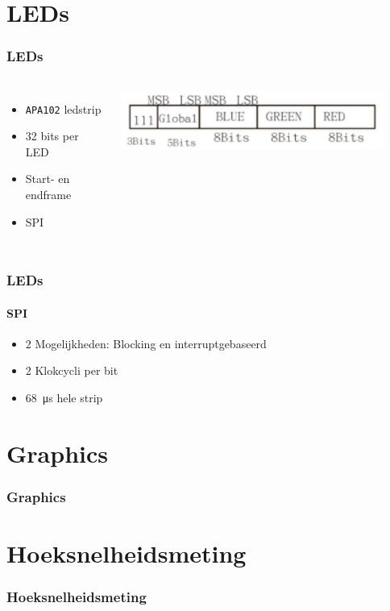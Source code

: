\documentclass{beamer}
\begin{document}
\section{LEDs}
\begin{frame}
  \frametitle{LEDs}

  \begin{columns}
    \begin{itemize}
    \item \texttt{APA102} ledstrip
    \item 32 bits per LED
    \item Start- en endframe
    \item SPI
    \end{itemize}

    \includegraphics[width=0.9\textwidth]{img/ledpakket.png}
  \end{columns}
\end{frame}

\begin{frame}
  \frametitle{LEDs}
  \framesubtitle{SPI}

  \begin{itemize}
  \item 2 Mogelijkheden: Blocking en interruptgebaseerd
  \item 2 Klokcycli per bit
  \item \SI{68}{\micro\second} hele strip
  \end{itemize}
\end{frame}

\section{Graphics}
\begin{frame}
  \frametitle{Graphics}
\end{frame}

\section{Hoeksnelheidsmeting}
\begin{frame}
  \frametitle{Hoeksnelheidsmeting}
\end{frame}
\end{document}
